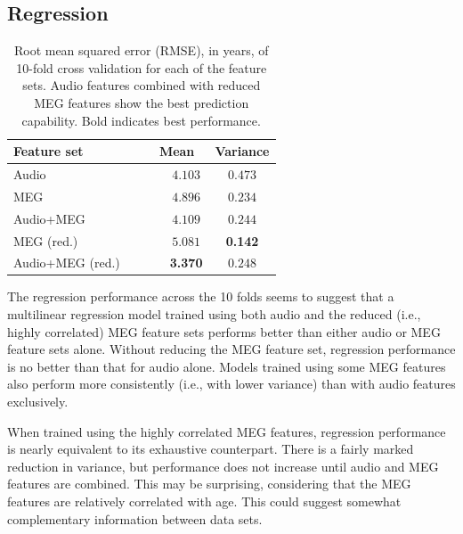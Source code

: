 \documentclass[utf8]{frontiersSCNS} %
\begin{document}
\subsection{Regression}

\begin{table}[t]
  \centering
  \label{tab:reg_results}
  \begin{tabular}{| l | c | c |}
    \toprule
    \multicolumn{1}{l}{\textbf{Feature set}} & \multicolumn{1}{c}{\textbf{Mean}} & \multicolumn{1}{c}{\textbf{Variance}} \\
    \toprule
        Audio~~~                             & ~~~$4.103$         &     $0.473$       \\
        MEG~~~                               & ~~~$4.896$         &     $0.234$       \\
        Audio+MEG~~~                         & ~~~$4.109$         &     $0.244$       \\

        \midrule
       
        MEG (red.)~~~                        & ~~~$5.081$         &     \textbf{0.142}       \\
        Audio+MEG (red.)~~~                  & ~~~\textbf{3.370}         &     $0.248$       \\

    \bottomrule
  \end{tabular}
  \caption{Root mean squared error (RMSE), in years, of 10-fold cross validation for each of the feature sets. Audio features combined with reduced MEG features show the best prediction capability. Bold indicates best performance.}
\end{table}

The regression performance across the 10 folds seems to suggest that a multilinear regression model trained using both audio and the reduced (i.e., highly correlated) MEG feature sets performs better than either audio or MEG feature sets alone. Without  reducing the MEG feature set, regression performance is no better than that for audio alone. Models trained using some MEG features also  perform more consistently (i.e., with lower variance) than with audio features exclusively.

When trained using the highly correlated MEG features, regression performance is nearly equivalent to its exhaustive counterpart. There is a fairly marked reduction in variance, but performance does not increase until audio and MEG features are combined. This may be surprising, considering that the MEG features are relatively correlated with age. This could suggest somewhat complementary information between data sets. %
\end{document}
